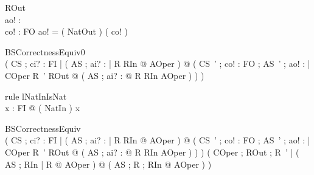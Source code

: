 \begin{schema}{ROut}
\\
 ao! : \nat \\
 co! : FO 
\where
 ao! = ( NatOut \inv ) ( co! )
\end{schema}



\begin{theorem}{ BSCorrectnessEquiv0}\\
 ( \forall CS ; ci? : FI | ( \forall AS ; ai? : \nat | R \land RIn @ \pre AOper ) @ ( \forall CS~' ; co! : FO ; AS~' ; ao! : \nat | COper \land R~' \land ROut @ ( \exists AS ; ai? : \nat @ R \land RIn \land AOper ) ) ) \\

\end{theorem}






\begin{theorem}{rule lNatInIsNat}\\
 \forall x : FI @ ( NatIn \inv ) x  \\

\end{theorem}



\begin{theorem}{ BSCorrectnessEquiv}\\
 ( \forall CS ; ci? : FI | ( \forall AS ; ai? : \nat | R \land RIn @ \pre AOper ) @ ( \forall CS~' ; co! : FO ; AS~' ; ao! : \nat | COper \land R~' \land ROut @ ( \exists AS ; ai? : \nat @ R \land RIn \land AOper ) ) ) \iff ( \forall COper ; ROut ; R~' | ( \forall AS ; RIn | R @ \pre AOper ) @ ( \exists AS ; R ; RIn @ AOper ) ) \\

\end{theorem}



